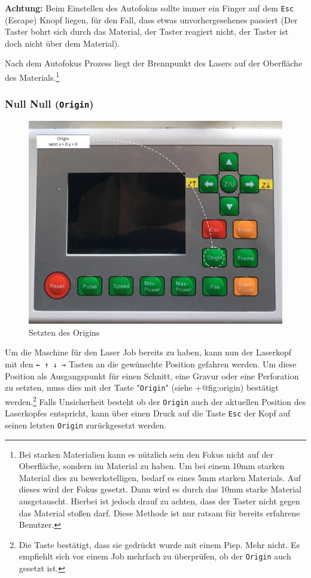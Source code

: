 \documentclass[]{article}
\begin{document}
\textbf{Achtung:} Beim Einstellen des Autofokus sollte immer ein Finger
auf dem \texttt{Esc} (Escape) Knopf liegen, für den Fall, dass etwas
unvorhergesehenes passiert (Der Taster bohrt sich durch das Material,
der Taster reagiert nicht, der Taster ist doch nicht über dem Material).

Nach dem Autofokus Prozess liegt der Brennpunkt des Lasers auf der
Oberfläche des Materials.\footnote{Bei starken Materialien kann es
  nützlich sein den Fokus nicht auf der Oberfläche, sondern im Material
  zu haben. Um bei einem 10mm starken Material dies zu bewerkstelligen,
  bedarf es eines 5mm starken Materials. Auf dieses wird der Fokus
  gesetzt. Dann wird es durch das 10mm starke Material ausgetauscht.
  Hierbei ist jedoch drauf zu achten, dass der Taster nicht gegen das
  Material stoßen darf. Diese Methode ist nur ratsam für bereits
  erfahrene Benutzer.}

\hypertarget{null-null-origin}{%
\subsubsection{\texorpdfstring{Null Null
(\texttt{Origin})}{Null Null (Origin)}}\label{null-null-origin}}

\begin{figure}
\hypertarget{fig:origin}{%
\centering
\includegraphics{assets/images/laser-origin.png}
\caption{Setzten des Origins}\label{fig:origin}
}
\end{figure}

Um die Maschine für den Laser Job bereits zu haben, kann nun der
Laserkopf mit den \texttt{←\ ↑\ ↓\ →} Tasten an die gewünschte Position
gefahren werden. Um diese Position als Ausgangspunkt für einen Schnitt,
eine Gravur oder eine Perforation zu setzten, muss dies mit der Taste
"\texttt{Origin}" (siehe +@fig:origin) bestätigt werden.\footnote{Die
  Taste bestätigt, dass sie gedrückt wurde mit einem Piep. Mehr nicht.
  Es empfiehlt sich vor einem Job mehrfach zu überprüfen, ob der
  \texttt{Origin} auch gesetzt ist.} Falls Unsicherheit besteht ob der
\texttt{Origin} auch der aktuellen Position des Laserkopfes entspricht,
kann über einen Druck auf die Taste \texttt{Esc} der Kopf auf seinen
letzten \texttt{Origin} zurückgesetzt werden.
\end{document}
